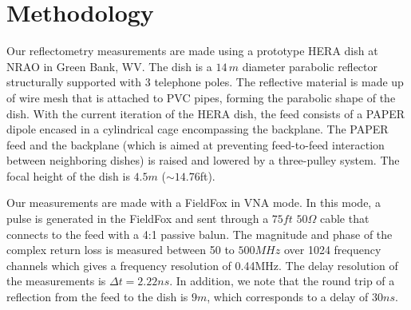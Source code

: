 \documentclass[12pt,preprint]{aastex}
\begin{document}
\section{Methodology}{\label{sec:methods}}

Our reflectometry measurements are made using a prototype HERA dish at NRAO in Green Bank, WV. The dish is a $14\,m$ diameter
parabolic reflector structurally supported with 3 telephone poles. The
reflective material is made up of wire mesh that is attached to PVC
pipes, forming the parabolic shape of the dish. With the current iteration of
the HERA dish, the feed consists of a PAPER dipole encased in a cylindrical cage
encompassing the backplane. The PAPER feed and the backplane (which is aimed at
preventing feed-to-feed interaction between neighboring dishes) is raised and
lowered by a three-pulley system. The focal height of the dish is $4.5m$
($\sim{14.76}$ft).  

Our measurements are made with a FieldFox in VNA mode. In this mode, a pulse
is generated in the FieldFox and sent through a $75ft$ $50\Omega$ cable that
connects to the feed with a 4:1 passive balun. The magnitude and phase of the complex return loss is measured between 50 to $500MHz$ over 1024 frequency channels which gives a frequency resolution of 0.44MHz. The delay resolution of the measurements is $\Delta{t}=2.22ns$.
In addition, we note that the round trip of a reflection from the feed to the dish
is $9m$, which corresponds to a delay of $30ns$.


\end{document}
